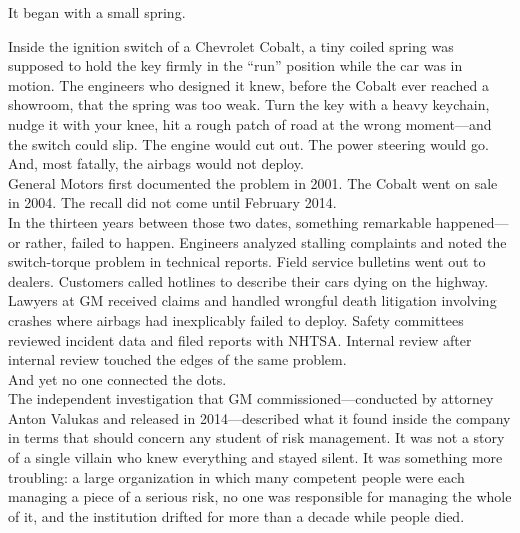 \documentclass[11pt,openany]{book}
\begin{document}
\clearpage
\begin{corporateexample}

  \vspace{0.5em}
  It began with a small spring.\\[0.5em]
 \vspace{0.5em}

Inside the ignition switch of a Chevrolet Cobalt, a tiny coiled spring was supposed to hold the key firmly in the ``run'' position while the car was in motion. The engineers who designed it knew, before the Cobalt ever reached a showroom, that the spring was too weak. Turn the key with a heavy keychain, nudge it with your knee, hit a rough patch of road at the wrong moment---and the switch could slip. The engine would cut out. The power steering would go. And, most fatally, the airbags would not deploy.
\vspace{0.5em}\\[0.5em]
General Motors first documented the problem in 2001. The Cobalt went on sale in 2004. The recall did not come until February 2014.
\vspace{0.5em}\\[0.5em] 
In the thirteen years between those two dates, something remarkable happened---or rather, failed to happen. Engineers analyzed stalling complaints and noted the switch-torque problem in technical reports. Field service bulletins went out to dealers. Customers called hotlines to describe their cars dying on the highway. Lawyers at GM received claims and handled wrongful death litigation involving crashes where airbags had inexplicably failed to deploy. Safety committees reviewed incident data and filed reports with NHTSA. Internal review after internal review touched the edges of the same problem.
\vspace{0.5em}\\[0.5em]   
And yet no one connected the dots.
\vspace{0.5em}\\[0.5em]     
The independent investigation that GM commissioned---conducted by attorney Anton Valukas and released in 2014---described what it found inside the company in terms that should concern any student of risk management. It was not a story of a single villain who knew everything and stayed silent. It was something more troubling: a large organization in which many competent people were each managing a piece of a serious risk, no one was responsible for managing the whole of it, and the institution drifted for more than a decade while people died.

\end{corporateexample}
\end{document}
